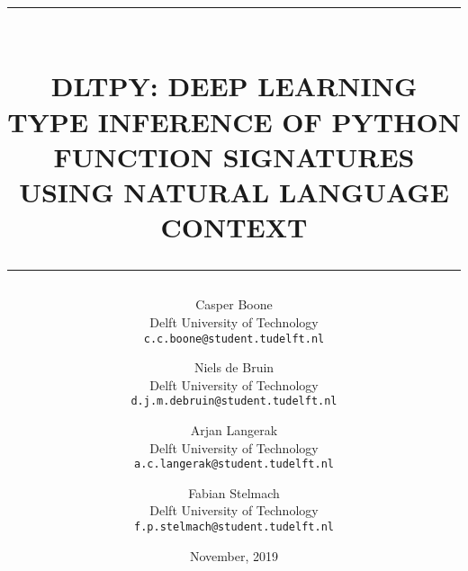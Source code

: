 \documentclass[10pt, twocolumn]{article}
\newcommand{\mydate}{November, 2019}
\newcommand\dltpy{DLTPy}
\newcommand{\HRule}[1]{\rule{\linewidth}{#1}}
\begin{document}


\selectfont
\title{ \normalsize \textsc{}
		\HRule{0.5pt} \\
		\Large \textbf{\uppercase{\dltpy: Deep Learning Type Inference of Python Function Signatures using Natural Language Context}}
		\HRule{2pt}}
		
\author{\small{}
	    Casper Boone \\
	    \small Delft University of Technology\\
	    \texttt{c.c.boone@student.tudelft.nl}
        \and
        \small{}
	    Niels de Bruin \\
	    \small Delft University of Technology\\
	    \texttt{d.j.m.debruin@student.tudelft.nl}
        \and
        \small{}
	    Arjan Langerak \\
	    \small Delft University of Technology\\
	    \texttt{a.c.langerak@student.tudelft.nl}
        \and
        \small{}
	    Fabian Stelmach \\
	    \small Delft University of Technology\\
	    \texttt{f.p.stelmach@student.tudelft.nl}
}

\date{\mydate}

\twocolumn[
\begin{@twocolumnfalse}
\maketitle

\end{@twocolumnfalse}
]















\setlength{\bibsep}{0em}
\renewcommand*{\bibfont}{\small}


\end{document}
